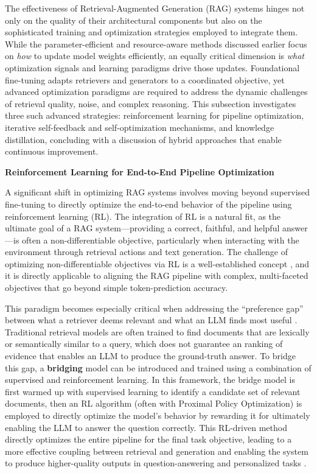\documentclass[11pt]{article}
\begin{document}
The effectiveness of Retrieval-Augmented Generation (RAG) systems hinges not only on the quality of their architectural components but also on the sophisticated training and optimization strategies employed to integrate them. While the parameter-efficient and resource-aware methods discussed earlier focus on \emph{how} to update model weights efficiently, an equally critical dimension is \emph{what} optimization signals and learning paradigms drive those updates. Foundational fine-tuning adapts retrievers and generators to a coordinated objective, yet advanced optimization paradigms are required to address the dynamic challenges of retrieval quality, noise, and complex reasoning. This subsection investigates three such advanced strategies: reinforcement learning for pipeline optimization, iterative self-feedback and self-optimization mechanisms, and knowledge distillation, concluding with a discussion of hybrid approaches that enable continuous improvement.

\textbf{Reinforcement Learning for End-to-End Pipeline Optimization}

A significant shift in optimizing RAG systems involves moving beyond supervised fine-tuning to directly optimize the end-to-end behavior of the pipeline using reinforcement learning (RL). The integration of RL is a natural fit, as the ultimate goal of a RAG system---providing a correct, faithful, and helpful answer---is often a non-differentiable objective, particularly when interacting with the environment through retrieval actions and text generation. The challenge of optimizing non-differentiable objectives via RL is a well-established concept \cite{ref227}, and it is directly applicable to aligning the RAG pipeline with complex, multi-faceted objectives that go beyond simple token-prediction accuracy.

This paradigm becomes especially critical when addressing the ``preference gap'' between what a retriever deems relevant and what an LLM finds most useful \cite{ref55}. Traditional retrieval models are often trained to find documents that are lexically or semantically similar to a query, which does not guarantee an ranking of evidence that enables an LLM to produce the ground-truth answer. To bridge this gap, a \textbf{bridging} model can be introduced and trained using a combination of supervised and reinforcement learning. In this framework, the bridge model is first warmed up with supervised learning to identify a candidate set of relevant documents, then an RL algorithm (often with Proximal Policy Optimization) is employed to directly optimize the model's behavior by rewarding it for ultimately enabling the LLM to answer the question correctly. This RL-driven method directly optimizes the entire pipeline for the final task objective, leading to a more effective coupling between retrieval and generation and enabling the system to produce higher-quality outputs in question-answering and personalized tasks \cite{ref55}.
\end{document}
